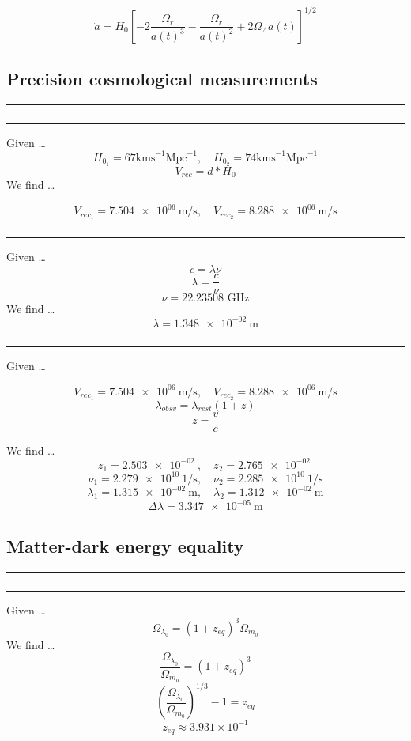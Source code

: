\documentclass{article}
\begin{document}
\[\boxed{\ddot{a} = H_0 \left[-2\frac{\Omega_r}{a(t)^3} - \frac{\Omega_r}{a(t)^2} + 2\Omega_\Lambda a(t) \right]^{1/2}}\]


\subsection{Precision cosmological measurements}
\hrule
\vspace{.5cm}

\subsubsection{}
\hrule
\vspace{.5cm}

Given \dots 
\[H_{0_1} = 67 \text{kms}^{-1} \text{Mpc}^{-1}, \quad H_{0_2} = 74 \text{kms}^{-1} \text{Mpc}^{-1}\]
\[V_{rec} = d * H_0\]
We find \dots 

\[\boxed{V_{rec_1} = \SI{7.504e+06}{\m / \s}, \quad V_{rec_2} = \SI{8.288e+06}{\m / \s}}\]

\subsubsection{}
\hrule
\vspace{.5cm}
Given \dots 
\[c = \lambda \nu\]
\[\lambda = \frac{c}{\nu}\]
\[\nu = 22.23508 \text{ GHz}\]
We find \dots 
\[\boxed{\lambda = \SI{1.348e-02}{\m}}\]

\subsubsection{}
\hrule
\vspace{.5cm}
Given \dots 

\[V_{rec_1} = \SI{7.504e+06}{\m / \s}, \quad V_{rec_2} = \SI{8.288e+06}{\m / \s}\]
\[\lambda_{obsv} = \lambda_{rest}(1 +z)\]
\[z = \frac{v}{c}\]

We find \dots 
\[z_1 = \SI{2.503e-02}{}, \quad z_2 = \SI{2.765e-02}{}\]
\[\nu_1 = \SI{2.279e+10}{1/\s},\quad \nu_2 = \SI{2.285e+10}{1/\s}\]
\[\lambda_1 = \SI{1.315e-02}{\m}, \quad \lambda_2 = \SI{1.312e-02}{\m}\]
\[\boxed{\Delta \lambda = \SI{3.347e-05}{\m}}\]


\subsection{Matter-dark energy equality}
\hrule
\vspace{.5cm}

\subsubsection{}
\hrule
\vspace{.5cm}
Given \dots 
\[\Omega_{\lambda_0} = (1+z_{eq})^3\Omega_{m_0}\]
We find \dots 
\[\frac{\Omega_{\lambda_0}}{\Omega_{m_0}}= (1+z_{eq})^3\]
\[\left(\frac{\Omega_{\lambda_0}}{\Omega_{m_0}}\right)^{1/3} -1 = z_{eq}\]
\[\boxed{z_{eq} \approx 3.931 \times 10^{-1}}\]
\end{document}
